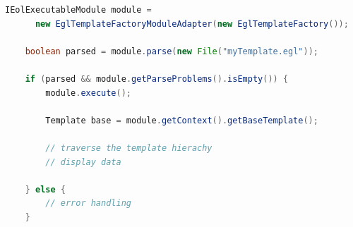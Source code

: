 \begin{lstlisting}[float=tbp, caption=Programmatically accessing the EGL traceability API (in Java)., label=lst:traceability, language=Java]
	IEolExecutableModule module = 
	  new EglTemplateFactoryModuleAdapter(new EglTemplateFactory());
	
	boolean parsed = module.parse(new File("myTemplate.egl"));
	
	if (parsed && module.getParseProblems().isEmpty()) {
		module.execute();

		Template base = module.getContext().getBaseTemplate();
		
		// traverse the template hierachy
		// display data 
		
	} else {
		// error handling
	}
\end{lstlisting}
